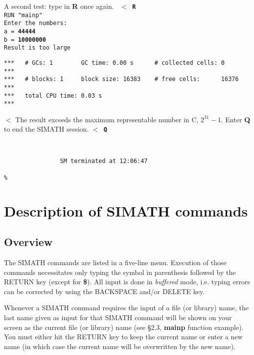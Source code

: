 A second test: type in {\bf R} once again.
\leer
{\tt
$<$ {\bf R} \care \\
RUN "mainp"\\[1.0eM]
Enter the numbers:\\
a = {\bf 44444 \care}\\
b = {\bf 10000000 \care}\\
Result is too large
}
\begin{verbatim}
***   # GCs: 1        GC time: 0.00 s      # collected cells: 0        *** 
***   # blocks: 1     block size: 16383    # free cells:      16376    ***  
***   total CPU time: 0.03 s                                           ***   
\end{verbatim}
$<$
\leer
The result exceeds the maximum representable number in C, $2^{31}-1$.
Enter {\bf Q} to end the SIMATH session.
\leer
{\tt $<$ {\bf Q} \care}
\begin{verbatim}


                SM terminated at 12:06:47 

%
\end{verbatim}

\newpage



\section{Description of SIMATH commands}

\subsection{Overview}
The SIMATH commands are listed in a five-line menu.  Execution of those
commands necessitates only typing the symbol in parenthesis followed by the RETURN
key (except for {\bf \$}). All input is done in {\em buffered\/} mode, i.e. typing
errors can be corrected by using the BACKSPACE and/or DELETE key.

Whenever a SIMATH command requires the input of a file (or library) name, the last
name given as input for that SIMATH command will be shown on your screen as the
current file (or library) name (see \S 2.3, {\bf mainp} function example). You must
either hit the RETURN key to keep the current name or enter a new name (in which
case the current name will be overwritten by the new name).

